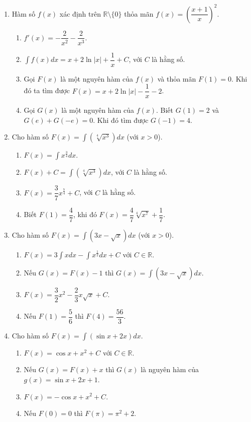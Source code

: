 \documentclass[12pt]{article}
\begin{document}
\begin{enumerate}[label=\textbf{Câu \arabic*.}, start=1]
		\item Hàm số $f(x)$ xác định trên $\mathbb{R} \setminus \{0\}$ thỏa mãn $f(x) = \left( \dfrac{x+1}{x} \right)^2$.
		\begin{enumerate}[label=\alph*)]
			\item $f'(x) = -\dfrac{2}{x^2} - \dfrac{2}{x^3}$.
			\item $\displaystyle \int f(x) dx = x + 2\ln|x| + \dfrac{1}{x} + C$, với $C$ là hằng số.
			\item Gọi $F(x)$ là một nguyên hàm của $f(x)$ và thỏa mãn $F(1) = 0$. Khi đó ta tìm được $F(x) = x + 2\ln|x| - \dfrac{1}{x} - 2$.
			\item Gọi $G(x)$ là một nguyên hàm của $f(x)$. Biết $G(1) = 2$ và $G(e) + G(-e) = 0$. Khi đó tìm được $G(-1) = 4$.
		\end{enumerate}
		
		\item Cho hàm số $F(x) = \displaystyle \int \left( \sqrt[4]{x^3} \right) dx$ (với $x > 0$).
		\begin{enumerate}[label=\alph*)]
			\item $F(x) = \displaystyle \int x^{\frac{3}{4}} dx$.
			\item $F(x) + C = \displaystyle \int \left( \sqrt[4]{x^3} \right) dx$, với $C$ là hằng số.
			\item $F(x) = \dfrac{3}{7} x^{\frac{7}{4}} + C$, với $C$ là hằng số.
			\item Biết $F(1) = \dfrac{4}{7}$, khi đó $F(x) = \dfrac{4}{7} \sqrt[4]{x^7} + \dfrac{1}{7}$.
		\end{enumerate}
		
		\item Cho hàm số $F(x) = \displaystyle \int (3x - \sqrt{x}) dx$ (với $x > 0$).
		\begin{enumerate}[label=\alph*)]
			\item $F(x) = \displaystyle 3 \int x dx - \int x^{\frac{1}{2}} dx + C$ với $C \in \mathbb{R}$.
			\item Nếu $G(x) = F(x) - 1$ thì $G(x) = \displaystyle \int (3x - \sqrt{x}) dx$.
			\item $F(x) = \dfrac{3}{2}x^2 - \dfrac{2}{3}x\sqrt{x} + C$.
			\item Nếu $F(1) = \dfrac{5}{6}$ thì $F(4) = \dfrac{56}{3}$.
		\end{enumerate}
		
		\item Cho hàm số $F(x) = \displaystyle \int (\sin x + 2x) dx$.
		\begin{enumerate}[label=\alph*)]
			\item $F(x) = \cos x + x^2 + C$ với $C \in \mathbb{R}$.
			\item Nếu $G(x) = F(x) + x$ thì $G(x)$ là nguyên hàm của $g(x) = \sin x + 2x + 1$.
			\item $F(x) = -\cos x + x^2 + C$.
			\item Nếu $F(0) = 0$ thì $F(\pi) = \pi^2 + 2$.
		\end{enumerate}
		

\end{enumerate}
\end{document}
